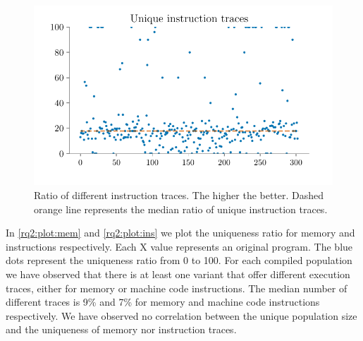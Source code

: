 \documentclass[sigplan,screen]{acmart}
\begin{document}
\begin{figure}
    \centering
    \includegraphics[width=\linewidth]{plots/rq2/instructions.pdf}
    \caption{Ratio of different instruction traces. The higher the better. Dashed orange line represents the median ratio of unique instruction traces.}
  \label{rq2:plot:ins}
\end{figure}


\newcommand{\memratio}{9\%\xspace}
\newcommand{\insratio}{7\%\xspace}

In \autoref{rq2:plot:mem} and \autoref{rq2:plot:ins} we plot the uniqueness ratio for memory and instructions respectively.
Each X value represents an original program.
The blue dots represent the uniqueness ratio from 0 to 100.
For each compiled population we have observed that there is at least one variant that offer different execution traces, either for memory or machine code instructions.
The median number of different traces is \memratio and \insratio for memory and machine code instructions respectively.
We have observed no correlation between the unique population size and the uniqueness of memory nor instruction traces.
\end{document}
